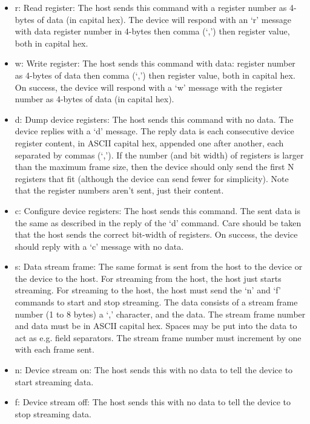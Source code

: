 \documentclass{customdocclass}
\begin{document}
\begin{itemize}
  \item r: Read register: The host sends this command with a register number as 4-bytes of data (in capital hex). The device will respond with an `r' message with data register number in 4-bytes then comma (`,') then register value, both in capital hex.
  \item w: Write register: The host sends this command with data: register number as 4-bytes of data then comma (`,') then register value, both in capital hex. On success, the device will respond with a `w' message with the register number as 4-bytes of data (in capital hex).
  \item d: Dump device registers: The host sends this command with no data. The device replies with a `d' message. The reply data is each consecutive device register content, in ASCII capital hex, appended one after another, each separated by commas (`,'). If the number (and bit width) of registers is larger than the maximum frame size, then the device should only send the first N registers that fit (although the device can send fewer for simplicity). Note that the register numbers aren't sent, just their content.
  \item c: Configure device registers: The host sends this command. The sent data is the same as described in the reply of the `d' command. Care should be taken that the host sends the correct bit-width of registers. On success, the device should reply with a `c' message with no data.
  \item s: Data stream frame: The same format is sent from the host to the device or the device to the host. For streaming from the host, the host just starts streaming. For streaming to the host, the host must send the `n' and `f' commands to start and stop streaming. The data consists of a stream frame number (1 to 8 bytes) a `,' character, and the data. The stream frame number and data must be in ASCII capital hex. Spaces may be put into the data to act as e.g. field separators. The stream frame number must increment by one with each frame sent.
  \item n: Device stream on: The host sends this with no data to tell the device to start streaming data.
  \item f: Device stream off: The host sends this with no data to tell the device to stop streaming data.
\end{itemize}
\end{document}
